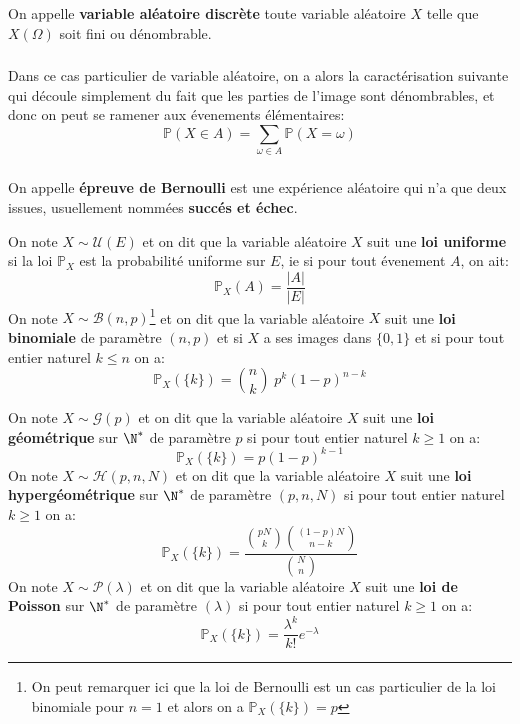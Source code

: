 \chapter*{} %
On appelle \textbf{variable aléatoire discrète} toute variable aléatoire \(X\) telle que \(X(\Omega)\) soit fini ou dénombrable.

\subsection*{}
Dans ce cas particulier de variable aléatoire, on a alors la caractérisation suivante qui découle simplement du fait que les parties de l'image sont dénombrables, et donc on peut se ramener aux évenements élémentaires:
\[
   \mathbb{P}(X \in A) = \sum_{\omega \in A} \mathbb{P}(X = \omega) 
\]

\subsection*{}
On appelle \textbf{épreuve de Bernoulli} est une expérience aléatoire qui n'a que deux issues, usuellement nommées \textbf{succés et échec}.\<

On note \(X \sim \mathcal{U}(E)\) et on dit que la variable aléatoire \(X\) suit une \textbf{loi uniforme} si la loi \(\mathbb{P}_X\) est la probabilité uniforme sur \(E\), ie si pour tout évenement \(A\), on ait:
\[
   \mathbb{P}_X(A) = \frac{|A|}{|E|}  
\]
On note \(X \sim \mathcal{B}(n, p)\)\footnote[1]{On peut remarquer ici que la loi de Bernoulli est un cas particulier de la loi binomiale pour \(n = 1\) et alors on a \(\mathbb{P}_X(\{k\}) = p\)} et on dit que la variable aléatoire \(X\) suit une \textbf{loi binomiale} de paramètre \((n, p)\) et  si \(X\) a ses images dans \(\{0, 1\}\) et si pour tout entier naturel \(k \leq n\) on a:
\[
   \mathbb{P}_X(\{k\}) = \binom{n}{k} \; p^k(1-p)^{n-k}
\]

On note \(X \sim \mathcal{G}(p)\) et on dit que la variable aléatoire \(X\) suit une \textbf{loi géométrique} sur \(\N^*\) de paramètre \(p\) si pour tout entier naturel \(k \geq 1\) on a:
\[
   \mathbb{P}_X(\{k\}) = p(1 - p)^{k - 1}
\]
On note \(X \sim \mathcal{H}(p, n, N)\) et on dit que la variable aléatoire \(X\) suit une \textbf{loi hypergéométrique} sur \(\N^*\) de paramètre \((p, n, N)\) si pour tout entier naturel \(k \geq 1\) on a:
\[
   \mathbb{P}_X(\{k\}) = \frac{\binom{pN}{k}\binom{(1-p)N}{n - k}}{\binom{N}{n}}
\]
On note \(X \sim \mathcal{P}(\lambda)\) et on dit que la variable aléatoire \(X\) suit une \textbf{loi de Poisson} sur \(\N^*\) de paramètre \((\lambda)\) si pour tout entier naturel \(k \geq 1\) on a:
\[
   \mathbb{P}_X(\{k\}) = \frac{\lambda^k}{k!}e^{-\lambda}
\]\<

